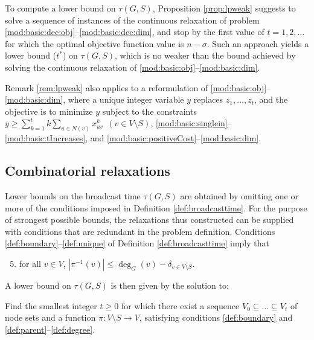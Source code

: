 \begin{remark} \label{rem:lpweak}
To compute a lower bound on $\tau(G,S)$, Proposition \ref{prop:lpweak} suggests to solve a sequence of instances of the continuous relaxation of problem \eqref{mod:basic:dec:obj}--\eqref{mod:basic:dec:dim},
and stop by the first value of $t=1,2,\ldots$ for which the optimal objective function value is $n-\sigma$.
Such an approach yields a lower bound ($t^{\ast}$) on $\tau(G,S)$,
which is no weaker than the bound achieved by solving the continuous relaxation of \eqref{mod:basic:obj}--\eqref{mod:basic:dim}.
\end{remark}

\begin{remark} \label{rem:otheropt}
Remark \ref{rem:lpweak} also applies to a reformulation of \eqref{mod:basic:obj}--\eqref{mod:basic:dim}, where a unique integer variable $y$ replaces $z_1,\ldots,z_t$,
and the objective is to minimize $y$ subject to the constraints
$y\geq\sum\limits_{k=1}^tk\sum\limits_{u \in N(v)}x_{uv}^k ~~(v\in V\setminus S)$, \eqref{mod:basic:singlein}--\eqref{mod:basic:tIncreases},
and \eqref{mod:basic:positiveCost}--\eqref{mod:basic:dim}.
\end{remark}

\subsection{Combinatorial relaxations} \label{sec:lbcombrel}

Lower bounds on the broadcast time $\tau(G,S)$ are obtained by omitting one or more of the conditions imposed in Definition \ref{def:broadcasttime}.
For the purpose of strongest possible bounds, the relaxations thus constructed can be supplied with conditions that are redundant in the problem definition.
Conditions \ref{def:boundary}--\ref{def:unique} of Definition \ref{def:broadcasttime} imply that
\begin{enumerate}
\setcounter{enumi}{4}
  \item for all $v\in V$, $\left|\pi^{-1}(v)\right|\leq\deg_G(v)-\delta_{v\in V\setminus S}$. \label{def:degree}
\end{enumerate}

\noindent
A lower bound on $\tau(G,S)$ is then given by the solution to:
\begin{problem}\label{prob:degree}
Find the smallest integer $t\geq 0$ for which there exist
a sequence $V_0\subseteq\dots\subseteq V_t$ of node sets and a function $\pi:V\setminus S\to V$,
satisfying conditions \ref{def:boundary} and \ref{def:parent}--\ref{def:degree}.
\end{problem}


